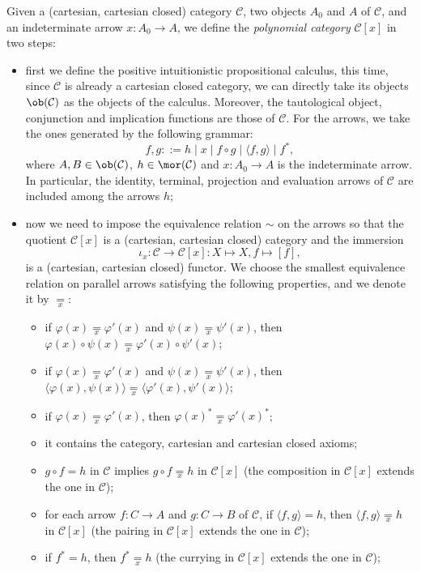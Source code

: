 \begin{definition}
    Given a (cartesian, cartesian closed) category $\mathcal C$, two objects $A_0$ and $A$ of $\mathcal C$, and an indeterminate arrow $x : A_0 \to A$, we define the \textit{polynomial category} $\mathcal C[x]$
    in two steps:
    \begin{itemize}
        \item first we define the positive intuitionistic propositional calculus, this time, since $\mathcal C$ is already a cartesian closed category, we can directly take its objects $\ob(\mathcal C)$ as the objects of the calculus. Moreover, the tautological object, conjunction and implication functions are those of $\mathcal C$. For the arrows,
        we take the ones generated by the following grammar:
        \[ f,g ::= h \mid x \mid f \circ g \mid \langle f,g\rangle \mid f^*, \]
        where $A, B \in \ob(\mathcal C)$, $h \in \mor(\mathcal C)$ and $x : A_0 \to A$ is the indeterminate arrow. In particular, the identity, terminal, projection and evaluation arrows of $\mathcal C$ are included among the arrows $h$;
        \item now we need to impose the equivalence relation $\sim$ on the arrows so that the quotient $\mathcal C[x]$ is a (cartesian, cartesian closed) category and the immersion
        \[ \iota_x : \mathcal C \rightarrow \mathcal C[x] : X \mapsto X, f \mapsto [f], \]
        is a (cartesian, cartesian closed) functor. We choose the smallest equivalence relation on parallel arrows satisfying the following properties, and we denote it by $\underset{x}{=}$:
        \begin{itemize}[label=$\ast$]
            \item if $\varphi(x) \underset{x}{=} \varphi'(x)$ and $\psi(x) \underset{x}{=} \psi'(x)$, then $\varphi(x) \circ \psi(x) \underset{x}{=} \varphi'(x) \circ \psi'(x)$;
            \item if $\varphi(x) \underset{x}{=} \varphi'(x)$ and $\psi(x) \underset{x}{=} \psi'(x)$, then $\langle \varphi(x), \psi(x)\rangle \underset{x}{=} \langle \varphi'(x), \psi'(x)\rangle$;
            \item if $\varphi(x) \underset{x}{=} \varphi'(x)$, then $\varphi(x)^* \underset{x}{=} \varphi'(x)^*$;
            \item it contains the category, cartesian and cartesian closed axioms;
            \item $g \circ f = h$ in $\mathcal C$ implies $g \circ f \underset{x}{=} h$ in $\mathcal C[x]$ (the composition in $\mathcal C[x]$ extends the one in $\mathcal C$);
            \item for each arrow $f : C \to A$ and $g : C \to B$ of $\mathcal C$, if $\langle f,g\rangle = h$, then $\langle f,g\rangle \underset{x}{=} h$ in $\mathcal C[x]$ (the pairing in $\mathcal C[x]$ extends the one in $\mathcal C$);
            \item if $f^* = h$, then $f^* \underset{x}{=} h$ (the currying in $\mathcal C[x]$ extends the one in $\mathcal C$);
        \end{itemize}
    \end{itemize}
\end{definition}

